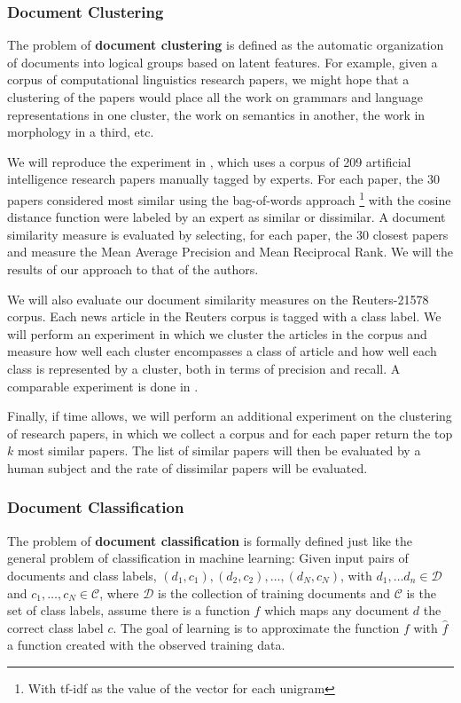 \documentclass[11pt]{article}
\newcommand{\bt}[1]{\textbf{#1}}
\begin{document}
\subsubsection{Document Clustering} \label{sec:DocumentClusterting}

The problem of \bt{document clustering} is defined as the automatic organization of documents into logical groups based on latent features. For example, given a corpus of computational linguistics research papers, we might hope that a clustering of the papers would place all the work on grammars and language representations in one cluster, the work on semantics in another, the work in morphology in a third, etc. 

We will reproduce the experiment in \cite{Hurtado2013},  which uses a corpus of 209 artificial intelligence research papers manually tagged by experts. For each paper, the 30 papers considered most similar using the bag-of-words approach \footnote{With tf-idf as the value of the vector for each unigram} with  the cosine distance function were labeled by an expert as similar or dissimilar. A document similarity measure is evaluated by selecting, for each paper, the 30 closest papers and measure the Mean Average Precision and Mean Reciprocal Rank. We will the results of our approach to that of the authors. 

We will also evaluate our document similarity measures on the Reuters-21578 corpus. Each news article in the Reuters corpus is tagged with a class label. We will perform an experiment in which we cluster the articles in the corpus and measure how well each cluster encompasses a class of article and how well each class is represented by a cluster, both in terms of precision and recall. A comparable experiment is done in \cite{Hofmann2000}. 

Finally, if time allows, we will perform an additional experiment on the clustering of research papers, in which we collect a corpus and for each paper return the top $k$ most similar papers. The list of similar papers will then be evaluated by a human subject and the rate of dissimilar papers will be evaluated. 

\subsubsection{Document Classification} \label{sec:DocumentClassification}

The problem of \textbf{document classification} is formally defined just like the general problem of classification in machine learning: Given input pairs of documents and class labels, $(d_1, c_1), (d_2, c_2), \dots, (d_N, c_N)$, with $d_1, \dots d_n \in \mathcal{D}$ and $c_1, \dots, c_N \in \mathcal{C}$, where  $\mathcal{D}$ is the collection of training documents and $\mathcal{C}$ is the set of class labels, assume there is a function $f$ which maps any document $d$ the correct class label $c$. The goal of learning is to approximate the function $f$ with $\hat{f}$ a function created with the observed training data. 
\end{document}
